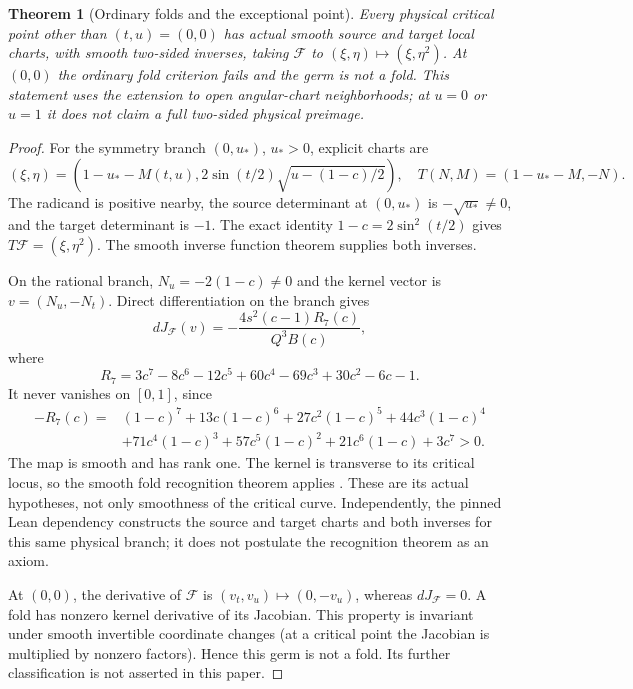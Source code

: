 \documentclass[11pt,a4paper]{article}
\newtheorem{theorem}{Theorem}[section]
\theoremstyle{definition}\newtheorem{definition}[theorem]{Definition}
\theoremstyle{remark}\newtheorem{remark}[theorem]{Remark}
\newcommand{\Map}{\mathcal F}\newcommand{\Pcore}{\mathcal P}
\begin{document}
\begin{theorem}[Ordinary folds and the exceptional point]\label{thm:fold}
Every physical critical point other than $(t,u)=(0,0)$ has actual smooth
source and target local charts, with smooth two-sided inverses, taking
$\Map$ to $(\xi,\eta)\mapsto(\xi,\eta^2)$.
At $(0,0)$ the ordinary fold criterion fails and the germ is not a fold.
This statement uses the extension to open angular-chart neighborhoods;
at $u=0$ or $u=1$ it does not claim a full two-sided physical preimage.
\end{theorem}
\begin{proof}
For the symmetry branch $(0,u_*)$, $u_*>0$, explicit charts are
\[
 (\xi,\eta)=\left(1-u_*-M(t,u),
        2\sin(t/2)\sqrt{u-(1-c)/2}\right),\quad
 T(N,M)=(1-u_*-M,-N).
\]
The radicand is positive nearby, the source determinant at $(0,u_*)$
is $-\sqrt{u_*}\ne0$, and the target determinant is $-1$.
The exact identity $1-c=2\sin^2(t/2)$ gives $T\Map=(\xi,\eta^2)$.
The smooth inverse function theorem supplies both inverses.

On the rational branch, $N_u=-2(1-c)\ne0$ and the kernel vector is
$v=(N_u,-N_t)$. Direct differentiation on the branch gives
\[
 dJ_{\Map}(v)=-\frac{4s^2(c-1)R_7(c)}{Q^3B(c)},
\]
where
\[
 R_7=3c^7-8c^6-12c^5+60c^4-69c^3+30c^2-6c-1.
\]
It never vanishes on $[0,1]$, since
\begin{align*}
 -R_7(c)={}&(1-c)^7+13c(1-c)^6+27c^2(1-c)^5
             +44c^3(1-c)^4\\
          &+71c^4(1-c)^3+57c^5(1-c)^2+21c^6(1-c)+3c^7>0.
\end{align*}
The map is smooth and has rank one. The kernel is transverse to its
critical locus, so the smooth fold recognition theorem applies
\cite[Theorem 3.4(1)]{ishikawa}. These are its actual hypotheses, not
only smoothness of the critical curve. Independently, the pinned Lean
dependency constructs the source and target charts and both inverses
for this same physical branch; it does not postulate the recognition
theorem as an axiom.

At $(0,0)$, the derivative of $\Map$ is $(v_t,v_u)\mapsto(0,-v_u)$,
whereas $dJ_{\Map}=0$. A fold has nonzero kernel derivative of its
Jacobian. This property is invariant under smooth invertible coordinate
changes (at a critical point the Jacobian is multiplied by nonzero
factors). Hence this germ is not a fold. Its further classification is
not asserted in this paper.
\end{proof}
\end{document}
